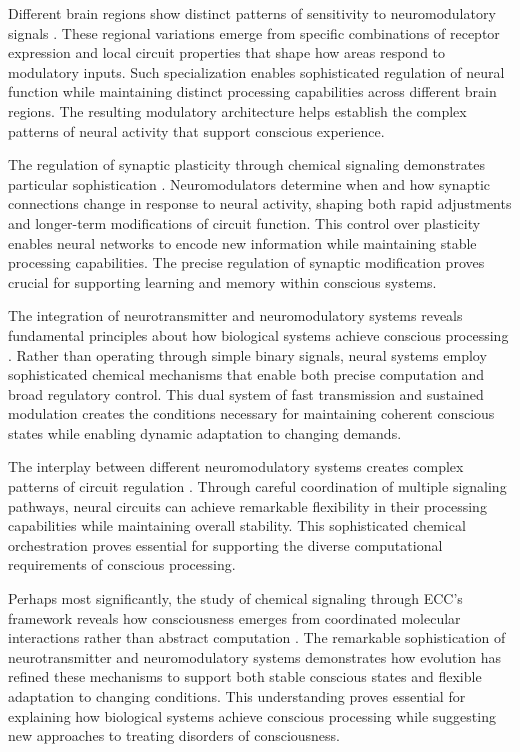 \begin{refsection}
Different brain regions show distinct patterns of sensitivity to neuromodulatory signals \cite{Parr2017}. These regional variations emerge from specific combinations of receptor expression and local circuit properties that shape how areas respond to modulatory inputs. Such specialization enables sophisticated regulation of neural function while maintaining distinct processing capabilities across different brain regions. The resulting modulatory architecture helps establish the complex patterns of neural activity that support conscious experience.

The regulation of synaptic plasticity through chemical signaling demonstrates particular sophistication \cite{Froemke2015}. Neuromodulators determine when and how synaptic connections change in response to neural activity, shaping both rapid adjustments and longer-term modifications of circuit function. This control over plasticity enables neural networks to encode new information while maintaining stable processing capabilities. The precise regulation of synaptic modification proves crucial for supporting learning and memory within conscious systems.

The integration of neurotransmitter and neuromodulatory systems reveals fundamental principles about how biological systems achieve conscious processing \cite{Picciotto2012}. Rather than operating through simple binary signals, neural systems employ sophisticated chemical mechanisms that enable both precise computation and broad regulatory control. This dual system of fast transmission and sustained modulation creates the conditions necessary for maintaining coherent conscious states while enabling dynamic adaptation to changing demands.

The interplay between different neuromodulatory systems creates complex patterns of circuit regulation \cite{Cools2011}. Through careful coordination of multiple signaling pathways, neural circuits can achieve remarkable flexibility in their processing capabilities while maintaining overall stability. This sophisticated chemical orchestration proves essential for supporting the diverse computational requirements of conscious processing.

Perhaps most significantly, the study of chemical signaling through ECC's framework reveals how consciousness emerges from coordinated molecular interactions rather than abstract computation \cite{Marder2012}. The remarkable sophistication of neurotransmitter and neuromodulatory systems demonstrates how evolution has refined these mechanisms to support both stable conscious states and flexible adaptation to changing conditions. This understanding proves essential for explaining how biological systems achieve conscious processing while suggesting new approaches to treating disorders of consciousness.


\end{refsection}
